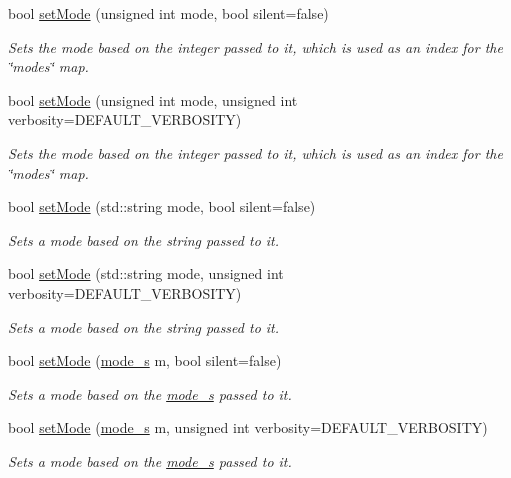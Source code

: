 \begin{DoxyCompactItemize}
bool \mbox{\hyperlink{classOptions_a430e86a75207637213cf868126f9bad3}{set\+Mode}} (unsigned int mode, bool silent=false)
\begin{DoxyCompactList}\small\item\em Sets the mode based on the integer passed to it, which is used as an index for the \char`\"{}modes\char`\"{} map. \end{DoxyCompactList}\item 
bool \mbox{\hyperlink{classOptions_a53f41c564dd16890a8704bfedcfe1cf3}{set\+Mode}} (unsigned int mode, unsigned int verbosity=D\+E\+F\+A\+U\+L\+T\+\_\+\+V\+E\+R\+B\+O\+S\+I\+TY)
\begin{DoxyCompactList}\small\item\em Sets the mode based on the integer passed to it, which is used as an index for the \char`\"{}modes\char`\"{} map. \end{DoxyCompactList}\item 
bool \mbox{\hyperlink{classOptions_afb29fb62cc0ace88c866919c296ed34b}{set\+Mode}} (std\+::string mode, bool silent=false)
\begin{DoxyCompactList}\small\item\em Sets a mode based on the string passed to it. \end{DoxyCompactList}\item 
bool \mbox{\hyperlink{classOptions_af474b43c0dd7e5342ca195a7912a7683}{set\+Mode}} (std\+::string mode, unsigned int verbosity=D\+E\+F\+A\+U\+L\+T\+\_\+\+V\+E\+R\+B\+O\+S\+I\+TY)
\begin{DoxyCompactList}\small\item\em Sets a mode based on the string passed to it. \end{DoxyCompactList}\item 
bool \mbox{\hyperlink{classOptions_a76e0100b6a554382ee6bc7d5795e6062}{set\+Mode}} (\mbox{\hyperlink{structmode__s}{mode\+\_\+s}} m, bool silent=false)
\begin{DoxyCompactList}\small\item\em Sets a mode based on the \mbox{\hyperlink{structmode__s}{mode\+\_\+s}} passed to it. \end{DoxyCompactList}\item 
bool \mbox{\hyperlink{classOptions_a29a9b31540b8ef3f66c1c03a6db3b253}{set\+Mode}} (\mbox{\hyperlink{structmode__s}{mode\+\_\+s}} m, unsigned int verbosity=D\+E\+F\+A\+U\+L\+T\+\_\+\+V\+E\+R\+B\+O\+S\+I\+TY)
\begin{DoxyCompactList}\small\item\em Sets a mode based on the \mbox{\hyperlink{structmode__s}{mode\+\_\+s}} passed to it. \end{DoxyCompactList}\item 

\end{DoxyCompactItemize}
